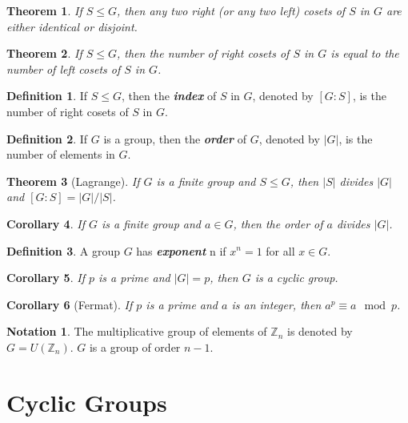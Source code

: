 \documentclass[12pt]{report}
\newtheorem{theorem}{Theorem}[chapter]
\newtheorem{corollary}[theorem]{Corollary}
\theoremstyle{definition}
\newtheorem*{definition}{Definition}
\newtheorem*{notation}{Notation}
\newcommand{\term}[1]{\textbf{\textit{#1}}}
\begin{document}
\begin{theorem}
	If $S\leq G$, then any two right (or any two left) cosets of $S$ in $G$ are either identical or disjoint.
\end{theorem}

\begin{theorem}
	If $S\leq G$, then the number of right cosets of $S$ in $G$ is equal to the number of left cosets of $S$ in $G$.
\end{theorem}

\begin{definition}
	If $S\leq G$, then the \term{index} of $S$ in $G$, denoted by $[G:S]$, is the number of right cosets of $S$ in $G$.
\end{definition}

\begin{definition}
	If $G$ is a group, then the \term{order} of $G$, denoted by $|G|$, is the number of elements in $G$.
\end{definition}

\begin{theorem}[Lagrange]
	If $G$ is a finite group and $S\leq G$, then $|S|$ divides $|G|$ and $[G:S] = |G|/|S|$.
\end{theorem}

\begin{corollary}
	If $G$ is a finite group and $a\in G$, then the order of $a$ divides $|G|$.
\end{corollary}

\begin{definition}
	A group $G$ has \term{exponent} n if $x^n=1$ for all $x\in G$.
\end{definition}

\begin{corollary}
	If $p$ is a prime and $|G|=p$, then $G$ is a cyclic group.
\end{corollary}

\begin{corollary}[Fermat]
	If $p$ is a prime and $a$ is an integer, then $a^p\equiv a\mod p$.
\end{corollary}

\begin{notation}
	The multiplicative group of elements of $\mathbb{Z}_n$ is denoted by $G = U(\mathbb{Z}_n)$. $G$ is a group of order $n-1$.
\end{notation}

\section{Cyclic Groups}
\end{document}
